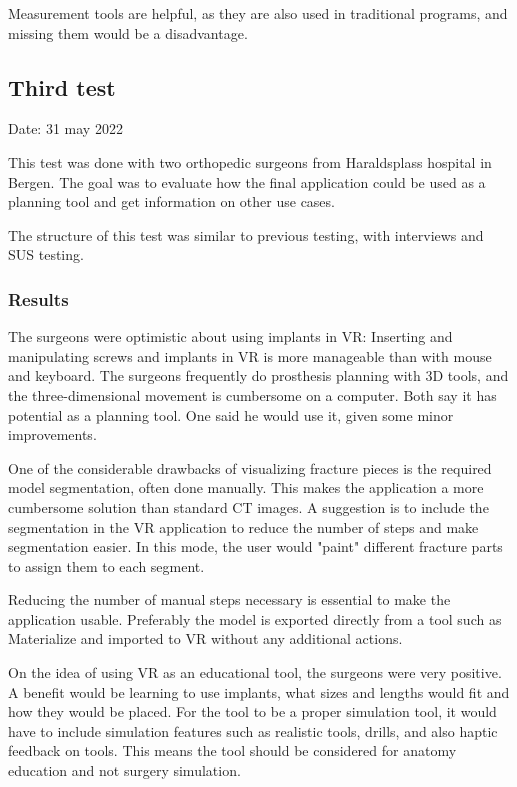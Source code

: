 \documentclass[a4paper]{report}
\begin{document}
Measurement tools are helpful, as they are also used in traditional programs, and missing them would be a disadvantage.

\subsection{Third test}
Date: 31 may 2022

This test was done with two orthopedic surgeons from Haraldsplass hospital in Bergen.
The goal was to evaluate how the final application could be used as a planning tool and get information on other use cases.


The structure of this test was similar to previous testing, with interviews and SUS testing.

\subsubsection{Results}
The surgeons were optimistic about using implants in VR: Inserting and manipulating screws and implants in VR is more manageable than with mouse and keyboard. The surgeons frequently do prosthesis planning with 3D tools, and the three-dimensional movement is cumbersome on a computer. 
Both say it has potential as a planning tool. One said he would use it, given some minor improvements.

One of the considerable drawbacks of visualizing fracture pieces is the required model segmentation, often done manually. This makes the application a more cumbersome solution than standard CT images. A suggestion is to include the segmentation in the VR application to reduce the number of steps and make segmentation easier. In this mode, the user would "paint" different fracture parts to assign them to each segment.

Reducing the number of manual steps necessary is essential to make the application usable. Preferably the model is exported directly from a tool such as Materialize and imported to VR without any additional actions.

On the idea of using VR as an educational tool, the surgeons were very positive. A benefit would be learning to use implants, what sizes and lengths would fit and how they would be placed. For the tool to be a proper simulation tool, it would have to include simulation features such as realistic tools, drills, and also haptic feedback on tools. This means the tool should be considered for anatomy education and not surgery simulation.
\end{document}
